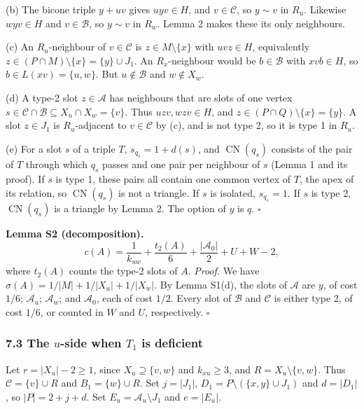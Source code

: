 (b) The bicone triple $y+uv$ gives $uyv\in H$, and $v\in\mathcal C$, so $y\sim v$ in $R_u$. Likewise $wyv\in H$ and $v\in\mathcal B$, so $y\sim v$ in $R_w$. Lemma 2 makes these its only neighbours.

(c) An $R_u$-neighbour of $v\in\mathcal C$ is $z\in M\setminus\{x\}$ with $uvz\in H$, equivalently $z\in(P\cap M)\setminus\{x\}=\{y\}\cup J_1$. An $R_x$-neighbour would be $b\in\mathcal B$ with $xvb\in H$, so $b\in L(xv)=\{u,w\}$. But $u\notin\mathcal B$ and $w\notin X_w$.

(d) A type-2 slot $z\in\mathcal A$ has neighbours that are slots of one vertex $s\in\mathcal C\cap\mathcal B\subseteq X_u\cap X_w=\{v\}$. Thus $uzv,wzv\in H$, and $z\in(P\cap Q)\setminus\{x\}=\{y\}$. A slot $z\in J_1$ is $R_u$-adjacent to $v\in\mathcal C$ by (c), and is not type 2, so it is type 1 in $R_u$.

(e) For a slot $s$ of a triple $T$, $s_{q_s}=1+d(s)$, and $\operatorname{CN}(q_s)$ consists of the pair of $T$ through which $q_s$ passes and one pair per neighbour of $s$ (Lemma 1 and its proof). If $s$ is type 1, these pairs all contain one common vertex of $T$, the apex of its relation, so $\operatorname{CN}(q_s)$ is not a triangle. If $s$ is isolated, $s_{q_s}=1$. If $s$ is type 2, $\operatorname{CN}(q_s)$ is a triangle by Lemma 2. The option of $y$ is $q$. \hfill$\square$

\textbf{Lemma S2 (decomposition).}
\[
 c(A)=\frac1{k_{uw}}+\frac{t_2(A)}6+\frac{|\mathcal A_0|}2+U+W-2,
\]
where $t_2(A)$ counts the type-2 slots of $A$.
\emph{Proof.} We have $\sigma(A)=1/|M|+1/|X_u|+1/|X_w|$. By Lemma S1(d), the slots of $\mathcal A$ are $y$, of cost $1/6$; $\mathcal A_u$; $\mathcal A_w$; and $\mathcal A_0$, each of cost $1/2$. Every slot of $\mathcal B$ and $\mathcal C$ is either type 2, of cost $1/6$, or counted in $W$ and $U$, respectively. \hfill$\square$

\subsubsection*{7.3 The $u$-side when $T_1$ is deficient}
Let $r=|X_u|-2\ge1$, since $X_u\supseteq\{v,w\}$ and $k_{xu}\ge3$, and $R=X_u\setminus\{v,w\}$. Thus $\mathcal C=\{v\}\cup R$ and $B_1=\{w\}\cup R$. Set $j=|J_1|$, $D_1=P\setminus(\{x,y\}\cup J_1)$ and $d=|D_1|$, so $|P|=2+j+d$. Set $E_u=\mathcal A_u\setminus J_1$ and $e=|E_u|$.

